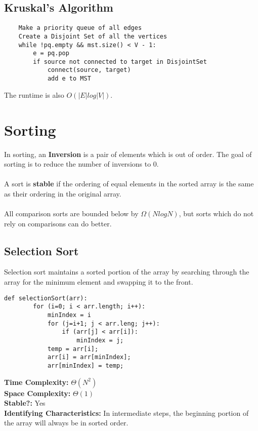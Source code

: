 \documentclass{article}
\begin{document}
\subsection{Kruskal's Algorithm}
\begin{lstlisting}
    Make a priority queue of all edges
    Create a Disjoint Set of all the vertices
    while !pq.empty && mst.size() < V - 1:
        e = pq.pop
        if source not connected to target in DisjointSet
            connect(source, target)
            add e to MST
\end{lstlisting}
The runtime is also $O(|E|log|V|)$.
\section{Sorting}
In sorting, an \textbf{Inversion} is a pair of elements which is out of order.
The goal of sorting is to reduce the number of inversions to 0.\\\\
A sort is \textbf{stable} if the ordering of equal elements in the sorted array is the same as their ordering in the original array.
\\\\
All comparison sorts are bounded below by $\Omega(NlogN)$, but sorts which do not rely on comparisons can do better.
\subsection{Selection Sort}
Selection sort maintains a sorted portion of the array by searching through the array for the minimum element and swapping it to the front.
\begin{lstlisting}[]
    def selectionSort(arr):
        for (i=0; i < arr.length; i++):
            minIndex = i
            for (j=i+1; j < arr.leng; j++):
                if (arr[j] < arr[i]):
                    minIndex = j;
            temp = arr[i];
            arr[i] = arr[minIndex];
            arr[minIndex] = temp;
\end{lstlisting}
\textbf{Time Complexity: } $\Theta(N^2)$\\
\textbf{Space Complexity: } $\Theta(1)$\\
\textbf{Stable?: } Yes\\
\textbf{Identifying Characteristics: } In intermediate steps, the beginning portion of the array will always be in sorted order. 
\end{document}
